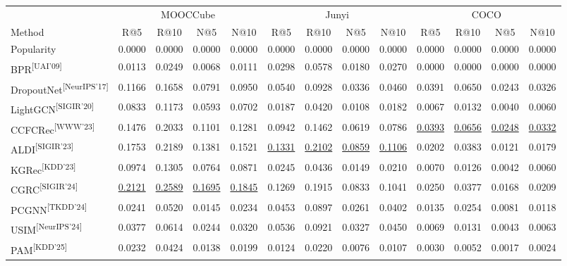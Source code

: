 \documentclass[10pt]{article}
\newcommand{\methodref}[1]{\textsuperscript{\scriptsize[#1]}}
\begin{document}
\setcounter{table}{1}
\begin{table}[!ht]
\centering
{
\small
\setlength{\tabcolsep}{1.35pt}
\renewcommand{\arraystretch}{0.98}
\begin{tabular}{lcccccccccccc}
\toprule
& \multicolumn{4}{c}{MOOCCube} & \multicolumn{4}{c}{Junyi} & \multicolumn{4}{c}{COCO} \\
\cmidrule(lr){2-5}\cmidrule(lr){6-9}\cmidrule(lr){10-13}
Method & R@5 & R@10 & N@5 & N@10 & R@5 & R@10 & N@5 & N@10 & R@5 & R@10 & N@5 & N@10 \\
\midrule
Popularity & 0.0000 & 0.0000 & 0.0000 & 0.0000 & 0.0000 & 0.0000 & 0.0000 & 0.0000 & 0.0000 & 0.0000 & 0.0000 & 0.0000 \\
BPR\methodref{UAI'09} & 0.0113 & 0.0249 & 0.0068 & 0.0111 & 0.0298 & 0.0578 & 0.0180 & 0.0270 & 0.0000 & 0.0000 & 0.0000 & 0.0000 \\
DropoutNet\methodref{NeurIPS'17} & 0.1166 & 0.1658 & 0.0791 & 0.0950 & 0.0540 & 0.0928 & 0.0336 & 0.0460 & 0.0391 & 0.0650 & 0.0243 & 0.0326 \\
LightGCN\methodref{SIGIR'20} & 0.0833 & 0.1173 & 0.0593 & 0.0702 & 0.0187 & 0.0420 & 0.0108 & 0.0182 & 0.0067 & 0.0132 & 0.0040 & 0.0060 \\
CCFCRec\methodref{WWW'23} & 0.1476 & 0.2033 & 0.1101 & 0.1281 & 0.0942 & 0.1462 & 0.0619 & 0.0786 & \underline{0.0393} & \underline{0.0656} & \underline{0.0248} & \underline{0.0332} \\
ALDI\methodref{SIGIR'23} & 0.1753 & 0.2189 & 0.1381 & 0.1521 & \underline{0.1331} & \underline{0.2102} & \underline{0.0859} & \underline{0.1106} & 0.0202 & 0.0383 & 0.0121 & 0.0179 \\
KGRec\methodref{KDD'23} & 0.0974 & 0.1305 & 0.0764 & 0.0871 & 0.0245 & 0.0436 & 0.0149 & 0.0210 & 0.0070 & 0.0126 & 0.0042 & 0.0060 \\
CGRC\methodref{SIGIR'24} & \underline{0.2121} & \underline{0.2589} & \underline{0.1695} & \underline{0.1845} & 0.1269 & 0.1915 & 0.0833 & 0.1041 & 0.0250 & 0.0377 & 0.0168 & 0.0209 \\
PCGNN\methodref{TKDD'24} & 0.0241 & 0.0520 & 0.0145 & 0.0234 & 0.0453 & 0.0897 & 0.0261 & 0.0402 & 0.0135 & 0.0254 & 0.0081 & 0.0118 \\
USIM\methodref{NeurIPS'24} & 0.0377 & 0.0614 & 0.0244 & 0.0320 & 0.0536 & 0.0921 & 0.0327 & 0.0450 & 0.0069 & 0.0131 & 0.0043 & 0.0063 \\
PAM\methodref{KDD'25} & 0.0232 & 0.0424 & 0.0138 & 0.0199 & 0.0124 & 0.0220 & 0.0076 & 0.0107 & 0.0030 & 0.0052 & 0.0017 & 0.0024 \\

\end{tabular}}
\end{table}
\end{document}
